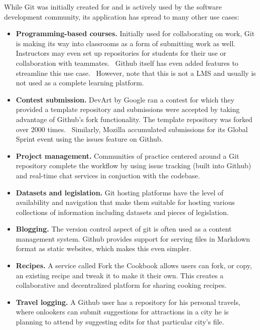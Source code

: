 \documentclass[12pt,twoside,vi]{mitthesis}
\newcommand{\draft}[1]{{\color{blue} #1}}
\begin{document}
\draft{
While Git was initially created for and is actively used by the software development community, its application has spread to many other use cases:

\begin{itemize}
\item \textbf{Programming-based courses.} Initially used for collaborating on work, Git is making its way into classrooms as a form of submitting work as well. Instructors may even set up repositories for students for their use or collaboration with teammates.~\cite{whygithubclassroom} Github itself has even added features to streamline this use case.~\cite{githubclassroom} However, note that this is not a LMS and usually is not used as a complete learning platform.
\item \textbf{Contest submission.} DevArt by Google ran a contest for which they provided a template repository and submissions were accepted by taking advantage of Github's fork functionality. The template repository was forked over 2000 times.~\cite{devart} Similarly, Mozilla accumulated submissions for its Global Sprint event using the issues feature on Github.~\cite{globalsprint}
\item \textbf{Project management.} Communities of practice centered around a Git repository complete the workflow by using issue tracking (built into Github) and real-time chat services in conjuction with the codebase.~\cite{githubpm}
\item \textbf{Datasets and legislation.} Git hosting platforms have the level of availability and navigation that make them suitable for hosting various collections of information including datasets and pieces of legislation.~\cite{sevenwaysgit}
\item \textbf{Blogging.} The version control aspect of git is often used as a content management system. Github provides support for serving files in Markdown format as static websites, which makes this even simpler.~\cite{whygithubclassroom}
\item \textbf{Recipes.} A service called Fork the Cookbook allows users can fork, or copy, an existing recipe and tweak it to make it their own. This creates a collaborative and decentralized platform for sharing cooking recipes.~\cite{forkthecookbook}
\item \textbf{Travel logging.} A Github user has a repository for his personal travels, where onlookers can submit suggestions for attractions in a city he is planning to attend by suggesting edits for that particular city's file.~\cite{travellog}
\end{itemize}

}
\end{document}
